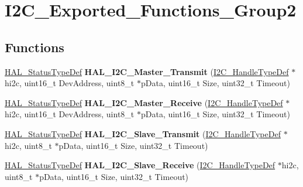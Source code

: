 \hypertarget{group___i2_c___exported___functions___group2}{\section{I2\-C\-\_\-\-Exported\-\_\-\-Functions\-\_\-\-Group2}
\label{group___i2_c___exported___functions___group2}
}
\subsection*{Functions}
\begin{DoxyCompactItemize}
\item 
\hypertarget{group___i2_c___exported___functions___group2_ga9440a306e25c7bd038cfa8619ec9a830}{\hyperlink{stm32l1xx__hal__def_8h_a63c0679d1cb8b8c684fbb0632743478f}{H\-A\-L\-\_\-\-Status\-Type\-Def} {\bfseries H\-A\-L\-\_\-\-I2\-C\-\_\-\-Master\-\_\-\-Transmit} (\hyperlink{struct_i2_c___handle_type_def}{I2\-C\-\_\-\-Handle\-Type\-Def} $\ast$hi2c, uint16\-\_\-t Dev\-Address, uint8\-\_\-t $\ast$p\-Data, uint16\-\_\-t Size, uint32\-\_\-t Timeout)}\label{group___i2_c___exported___functions___group2_ga9440a306e25c7bd038cfa8619ec9a830}

\item 
\hypertarget{group___i2_c___exported___functions___group2_ga6b3cef8c309e88ed6d3b8deba149aac9}{\hyperlink{stm32l1xx__hal__def_8h_a63c0679d1cb8b8c684fbb0632743478f}{H\-A\-L\-\_\-\-Status\-Type\-Def} {\bfseries H\-A\-L\-\_\-\-I2\-C\-\_\-\-Master\-\_\-\-Receive} (\hyperlink{struct_i2_c___handle_type_def}{I2\-C\-\_\-\-Handle\-Type\-Def} $\ast$hi2c, uint16\-\_\-t Dev\-Address, uint8\-\_\-t $\ast$p\-Data, uint16\-\_\-t Size, uint32\-\_\-t Timeout)}\label{group___i2_c___exported___functions___group2_ga6b3cef8c309e88ed6d3b8deba149aac9}

\item 
\hypertarget{group___i2_c___exported___functions___group2_ga9128c5f01406d0da061a2bce00b6866e}{\hyperlink{stm32l1xx__hal__def_8h_a63c0679d1cb8b8c684fbb0632743478f}{H\-A\-L\-\_\-\-Status\-Type\-Def} {\bfseries H\-A\-L\-\_\-\-I2\-C\-\_\-\-Slave\-\_\-\-Transmit} (\hyperlink{struct_i2_c___handle_type_def}{I2\-C\-\_\-\-Handle\-Type\-Def} $\ast$hi2c, uint8\-\_\-t $\ast$p\-Data, uint16\-\_\-t Size, uint32\-\_\-t Timeout)}\label{group___i2_c___exported___functions___group2_ga9128c5f01406d0da061a2bce00b6866e}

\item 
\hypertarget{group___i2_c___exported___functions___group2_ga92b445a5ca4f5b8195f1c10ebdc41687}{\hyperlink{stm32l1xx__hal__def_8h_a63c0679d1cb8b8c684fbb0632743478f}{H\-A\-L\-\_\-\-Status\-Type\-Def} {\bfseries H\-A\-L\-\_\-\-I2\-C\-\_\-\-Slave\-\_\-\-Receive} (\hyperlink{struct_i2_c___handle_type_def}{I2\-C\-\_\-\-Handle\-Type\-Def} $\ast$hi2c, uint8\-\_\-t $\ast$p\-Data, uint16\-\_\-t Size, uint32\-\_\-t Timeout)}\label{group___i2_c___exported___functions___group2_ga92b445a5ca4f5b8195f1c10ebdc41687}


\end{DoxyCompactItemize}
